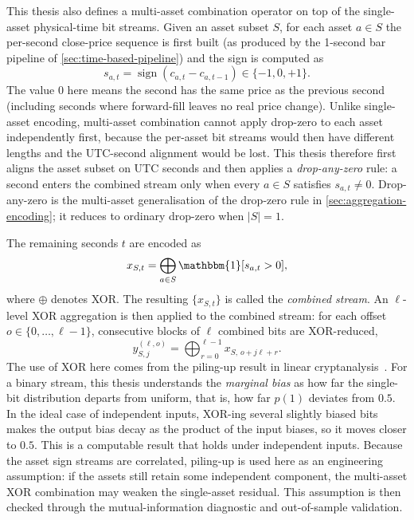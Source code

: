 \documentclass[11pt,titlepage,openany,oneside]{book}  %
\begin{document}
This thesis also defines a multi-asset combination operator on top of the single-asset physical-time bit streams. Given an asset subset $S$, for each asset $a \in S$ the per-second close-price sequence is first built (as produced by the 1-second bar pipeline of \cref{sec:time-based-pipeline}) and the sign is computed as
\begin{equation}
s_{a,t} = \operatorname{sign}(c_{a,t} - c_{a,t-1}) \in \{-1, 0, +1\}.
\end{equation}
The value $0$ here means the second has the same price as the previous second (including seconds where forward-fill leaves no real price change). Unlike single-asset encoding, multi-asset combination cannot apply drop-zero to each asset independently first, because the per-asset bit streams would then have different lengths and the UTC-second alignment would be lost. This thesis therefore first aligns the asset subset on UTC seconds and then applies a \emph{drop-any-zero} rule: a second enters the combined stream only when every $a \in S$ satisfies $s_{a,t} \neq 0$. Drop-any-zero is the multi-asset generalisation of the drop-zero rule in \cref{sec:aggregation-encoding}; it reduces to ordinary drop-zero when $|S| = 1$.

The remaining seconds $t$ are encoded as
\begin{equation}
x_{S,t} = \bigoplus_{a \in S} \mathbbm{1}[s_{a,t} > 0],
\end{equation}
where $\oplus$ denotes XOR. The resulting $\{x_{S,t}\}$ is called the \emph{combined stream}. An $\ell$-level XOR aggregation is then applied to the combined stream: for each offset $o \in \{0, \ldots, \ell - 1\}$, consecutive blocks of $\ell$ combined bits are XOR-reduced,
\begin{equation}
y^{(\ell, o)}_{S, j} = \bigoplus_{r=0}^{\ell - 1} x_{S,\, o + j\ell + r}.
\end{equation}
The use of XOR here comes from the piling-up result in linear cryptanalysis~\citep{matsui1994linear}. For a binary stream, this thesis understands the \emph{marginal bias} as how far the single-bit distribution departs from uniform, that is, how far $p(1)$ deviates from $0.5$. In the ideal case of independent inputs, XOR-ing several slightly biased bits makes the output bias decay as the product of the input biases, so it moves closer to $0.5$. This is a computable result that holds under independent inputs. Because the asset sign streams are correlated, piling-up is used here as an engineering assumption: if the assets still retain some independent component, the multi-asset XOR combination may weaken the single-asset residual. This assumption is then checked through the mutual-information diagnostic and out-of-sample validation.
\end{document}
